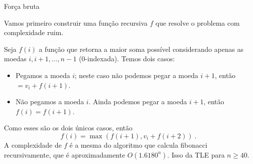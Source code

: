 \begin{frame}{Força bruta}

    Vamos primeiro construir uma função recursiva $f$ que resolve o problema com complexidade ruim.

    Seja $f(i)$ a função que retorna a maior soma possível considerando apenas as moedas $i, i+1, \dots, n-1$ (0-indexada). Temos dois casos:
    \begin{itemize}
        \item Pegamos a moeda $i$; neste caso não podemos pegar a moeda $i+1$, então $ = v_i + f(i+1)$.
        \item Não pegamos a moeda $i$. Ainda podemos pegar a moeda $i+1$, então $f(i) = f(i+1)$.
    \end{itemize}
    Como esses são os dois únicos casos, então
        \[ f(i) = \max(f(i+1), v_i + f(i+2)) \ . \] 
    A complexidade de $f$ é a mesma do algoritmo que calcula fibonacci recursivamente, que é aproximadamente $O(1.6180^n)$. Isso da TLE para $n \geq 40$.
    
    

\end{frame}

